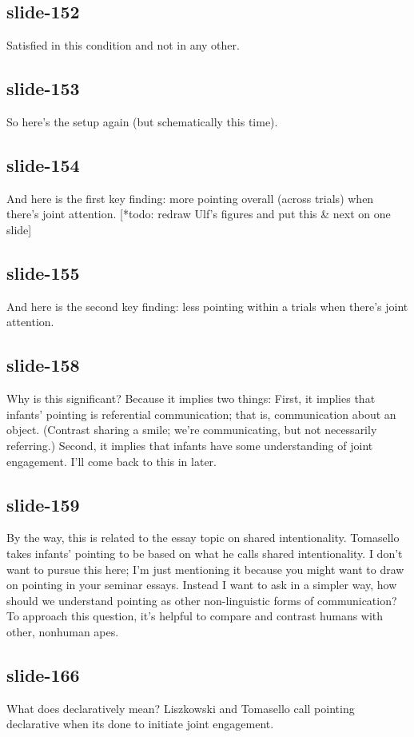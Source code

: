 \documentclass[12pt,\papersize]{extarticle}
\begin{document}
 
\subsection{slide-152}
Satisfied in this condition and not in any other.
 
 
\subsection{slide-153}
So here's the setup again (but schematically this time).
 
 
\subsection{slide-154}
And here is the first key finding: more pointing overall (across trials) when there's joint attention.
[*todo: redraw Ulf's figures and put this \& next on one slide]
 
 
\subsection{slide-155}
And here is the second key finding: less pointing within a trials when there's joint attention.
 
 
\subsection{slide-158}
Why is this significant?
Because it implies two things:
First, it implies that infants' pointing is referential communication; that is, communication about an object.
(Contrast sharing a smile; we're communicating, but not necessarily referring.)
Second, it implies that infants have some understanding of joint engagement.
I'll come back to this in later.
 
 
\subsection{slide-159}
By the way, this is related to the essay topic on shared intentionality.
Tomasello takes infants' pointing to be based on what he calls shared intentionality.
I don't want to pursue this here; I'm just mentioning it because you might want to draw on pointing in your seminar essays.
Instead I want to ask in a simpler way, how should we understand pointing as other non-linguistic forms of communication?
To approach this question, it's helpful to compare and contrast humans with other, nonhuman apes.
 
 
\subsection{slide-166}
What does declaratively mean? Liszkowski and Tomasello call pointing declarative when its done to initiate joint engagement.
 
\end{document}
